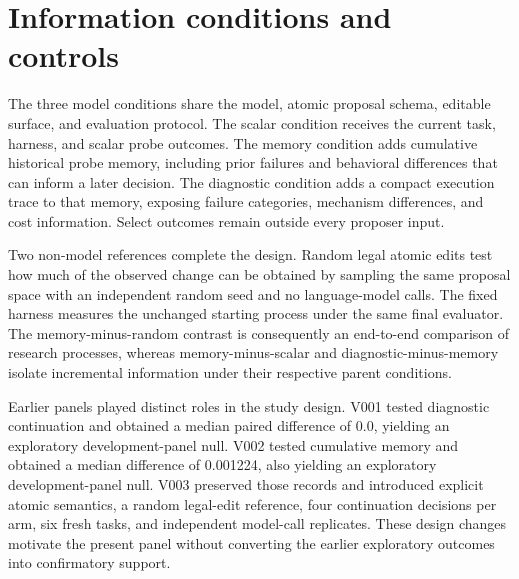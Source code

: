 \section{Information conditions and controls}
\label{sec:information}

The three model conditions share the model, atomic proposal schema, editable surface, and evaluation protocol. The scalar condition receives the current task, harness, and scalar probe outcomes. The memory condition adds cumulative historical probe memory, including prior failures and behavioral differences that can inform a later decision. The diagnostic condition adds a compact execution trace to that memory, exposing failure categories, mechanism differences, and cost information. Select outcomes remain outside every proposer input.

Two non-model references complete the design. Random legal atomic edits test how much of the observed change can be obtained by sampling the same proposal space with an independent random seed and no language-model calls. The fixed harness measures the unchanged starting process under the same final evaluator. The memory-minus-random contrast is consequently an end-to-end comparison of research processes, whereas memory-minus-scalar and diagnostic-minus-memory isolate incremental information under their respective parent conditions.

Earlier panels played distinct roles in the study design. V001 tested diagnostic continuation and obtained a median paired difference of 0.0, yielding an exploratory development-panel null. V002 tested cumulative memory and obtained a median difference of 0.001224, also yielding an exploratory development-panel null. V003 preserved those records and introduced explicit atomic semantics, a random legal-edit reference, four continuation decisions per arm, six fresh tasks, and independent model-call replicates. These design changes motivate the present panel without converting the earlier exploratory outcomes into confirmatory support.
